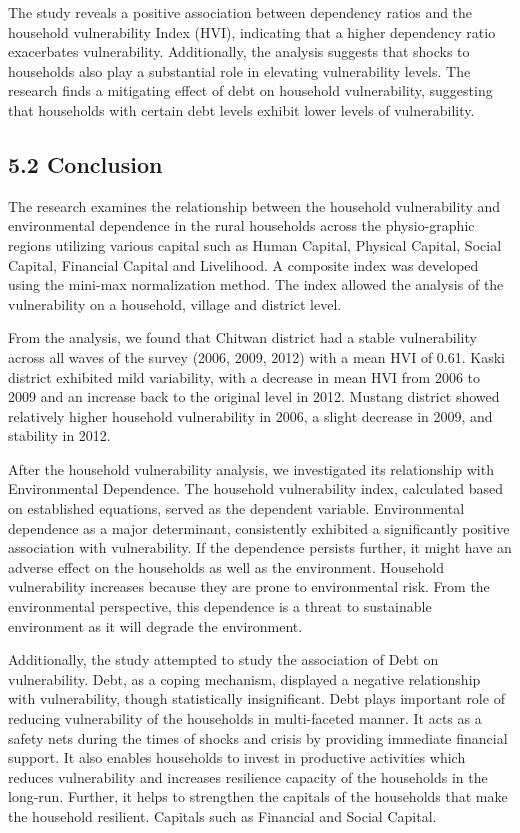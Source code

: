 \documentclass[12pt, a4paper]{article}
\begin{document}
The study reveals a positive association between dependency ratios and the household vulnerability Index (HVI), indicating that a higher dependency ratio exacerbates vulnerability. Additionally, the analysis suggests that shocks to households also play a substantial role in elevating vulnerability levels. The research finds a mitigating effect of debt on household vulnerability, suggesting that households with certain debt levels exhibit lower levels of vulnerability. 


\subsection*{5.2 Conclusion}
\renewcommand{\thepage}{\arabic{page}}
The research examines the relationship between the household vulnerability and environmental dependence in the rural households across the physio-graphic regions utilizing various capital such as Human Capital, Physical Capital, Social Capital, Financial Capital and Livelihood. A composite index was developed using the mini-max normalization method. The index allowed the analysis of the vulnerability on a household, village and district level. 

From the analysis, we found that Chitwan district had a stable vulnerability across all waves of the survey (2006, 2009, 2012) with a mean HVI of 0.61. Kaski district exhibited mild variability, with a decrease in mean HVI from 2006 to 2009 and an increase back to the original level in 2012.
Mustang district showed relatively higher household vulnerability in 2006, a slight decrease in 2009, and stability in 2012. 

After the household vulnerability analysis, we investigated its relationship with Environmental Dependence. The household vulnerability index, calculated based on established equations, served as the dependent variable. Environmental dependence as a major determinant, consistently exhibited a significantly positive association with vulnerability. If the dependence persists further, it might have an adverse effect on the households as well as the environment. Household vulnerability increases because they are prone to environmental risk. From the environmental perspective, this dependence is a threat to sustainable environment as it will degrade the environment.

Additionally, the study attempted to study the association of Debt on vulnerability. Debt, as a coping mechanism, displayed a negative relationship with vulnerability, though statistically insignificant. Debt plays important role of reducing vulnerability of the households in multi-faceted manner. It acts as a safety nets during the times of shocks and crisis by providing immediate financial support. It also enables households to invest in productive activities which reduces vulnerability and increases resilience capacity of the households in the long-run. Further, it helps to strengthen the capitals of the households that make the household resilient. Capitals such as Financial and Social Capital.  
\end{document}
